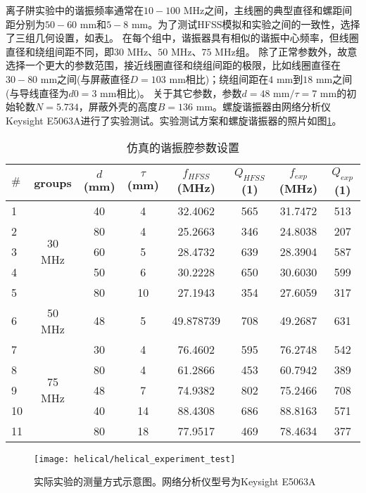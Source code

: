 离子阱实验中的谐振频率通常在$10-100$ MHz之间，主线圈的典型直径和螺距间距分别为$50-60 $ mm和$5-8$ mm。为了测试HFSS模拟和实验之间的一致性，选择了三组几何设置，如表\ref{tb:helical_simulation_parameters}。
在每个组中，谐振器具有相似的谐振中心频率，但线圈直径和绕组间距不同，即$30$ MHz、$50$ MHz、$75$ MHz组。
除了正常参数外，故意选择一个更大的参数范围，接近线圈直径和绕组间距的极限，比如线圈直径在$30-80$ mm之间(与屏蔽直径$D=103$ mm相比)；绕组间距在$4$ mm到$ 18$ mm之间(与导线直径为$d0 = 3$ mm相比)。
关于其它参数，参数$d=48$ mm$/\tau = 7$ mm的初始轮数$N = 5.734$，屏蔽外壳的高度$ B = 136$ mm。螺旋谐振器由网络分析仪Keysight E5063A进行了实验测试。实验测试方案和螺旋谐振器的照片如图\ref{fig:helical_experiment_test}。
\begin{table}
    \centering
    \caption[仿真的谐振腔参数设置]{仿真的谐振腔参数设置\label{tb:helical_simulation_parameters}}
    \begin{tabular}{lccccccc}
        \toprule
        $\#$ & groups & $d$(mm) & $\tau$(mm) & $f_{HFSS}$(MHz) & $Q_{HFSS}$(1) & $f_{exp}$(MHz) & $Q_{exp}$(1) \\
        \midrule

        1 & \multirow{5}{*}{30 MHz} 	& 40 & 4  & 32.4062 & 565 & 31.7472 & 513   \\
        2 & 						& 80 & 4  & 25.2663 & 346 & 24.8038 & 207   \\
        3 & 						& 60 & 5  & 28.4732 & 639 & 28.3904 & 587   \\
        4 & 						& 50 & 6  & 30.2228 & 650 & 30.6030 & 599   \\
        5 & 						& 80 & 10 & 27.1943 & 354 & 27.6059 & 317   \\
        \midrule
        6 & 50 MHz 					& 48 & 5  & 49.878739 & 708 & 49.2687 & 631   \\
        \midrule
        7 & \multirow{5}{*}{75 MHz} 	& 30 & 4  & 76.4602 & 595 & 76.2748 & 542   \\
        8 & 						& 80 & 4  & 61.2866 & 453 & 60.7942 & 389   \\
        9 & 						& 48 & 7  & 74.9382 & 802 & 75.2466 & 708   \\
        10 & 						& 40 & 14 & 88.4308 & 686 & 88.8163 & 571   \\
        11 & 						& 80 & 18 & 77.9517 & 469 & 78.4634 & 377   \\
        \bottomrule
    \end{tabular}
\end{table}


\begin{figure}
    \centering
    \texttt{[image: helical/helical\_experiment\_test]}
    \caption[实际实验的测量方式示意图]{实际实验的测量方式示意图。网络分析仪型号为Keysight E5063A\label{fig:helical_experiment_test}}
\end{figure}

